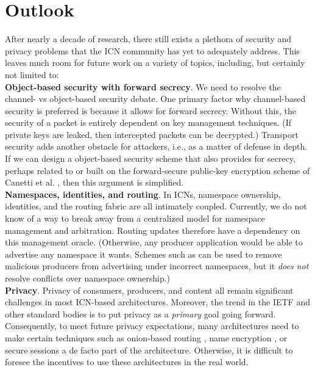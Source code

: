 \section{Outlook}
After nearly a decade of research, there still exists a plethora of security
and privacy problems that the ICN community has yet to adequately address. 
This leaves much room for future work on a variety of topics, including, but
certainly not limited to:\\

\noindent
{\bf Object-based security with forward secrecy}. We need to resolve the 
    channel- vs object-based security debate. One primary factor why channel-based
    security is preferred is because it allows for forward secrecy. Without this,
    the security of a packet is entirely dependent on key management techniques.
    (If private keys are leaked, then intercepted packets can be decrypted.)
    Transport security adds another obstacle for attackers, i.e., as a matter
    of defense in depth. If we can design a object-based security scheme that
    also provides for secrecy, perhaps related to or built on the forward-secure public-key
    encryption scheme of Canetti et al. \cite{canetti2003forward}, then this argument is simplified.\\

\noindent
{\bf Namespaces, identities, and routing}. In ICNs, namespace ownership, identities, and
    the routing fabric are all intimately coupled. Currently, we do not know of a way
    to break away from a centralized model for namespace management and arbitration. 
    Routing updates therefore have a dependency on this management oracle. (Otherwise,
    any producer application would be able to advertise any namespace it wants. Schemes
    such as \cite{dibenedetto2015mitigating} can be used to remove malicious producers
    from advertising under incorrect namespaces, but it \emph{does not} resolve conflicts
    over namespace ownership.)\\

\noindent
{\bf Privacy}. Privacy of consumers, producers, and content all remain significant
    challenges in most ICN-based architectures. Moreover, the trend in the IETF and other
    standard bodies is to put privacy as a \emph{primary} goal going forward. Consequently,
    to meet future privacy expectations, many architectures need to make certain techniques
    such as onion-based routing \cite{uzun2011anonymous}, name encryption \cite{privacy}, or secure
    sessions \cite{wood-icnrg-ccnxkeyexchange-00} a de facto part of the architecture. 
    Otherwise, it is difficult to foresee the incentives to use these architectures in the
    real world.
